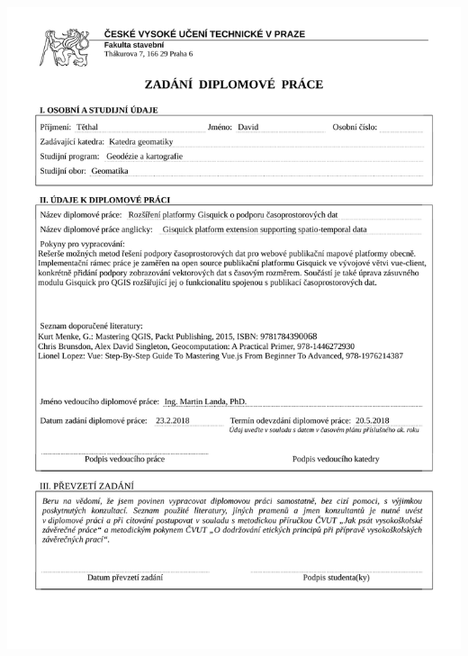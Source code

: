 \documentclass[12pt,a4paper]{article}
\author{David Těthal}
\begin{document}
\pagestyle{empty}

\newpage


\includegraphics[scale=0.8]{../zadani/zadanidp}
\restoregeometry
\end{document}
